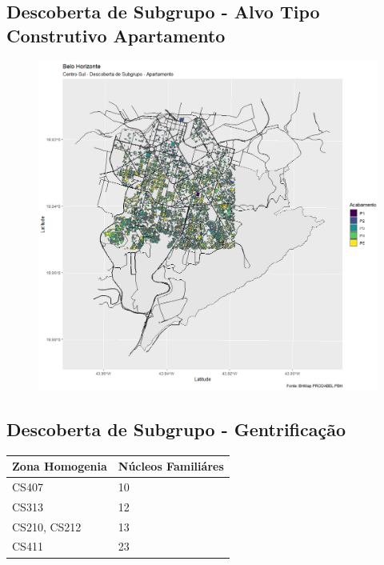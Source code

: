 \subsection{Descoberta de Subgrupo - Alvo Tipo Construtivo Apartamento}
\begin{frame}

    \begin{figure}[!htbp]
                \centering
       	    \includegraphics[scale=0.26]{imagens/cortana-ap.png}
            \end{figure}
\end{frame}

\subsection{Descoberta de Subgrupo - Gentrificação}
\begin{frame}

	\begin{table}[]
		\begin{tabular}{|l|l|}
			\hline
			\textbf{Zona Homogenia} & \textbf{Núcleos Familiáres}\\
			\hline
			\hline
			CS407 & 10 \\
			\hline
			CS313 & 12 \\
			\hline
			CS210, CS212 & 13 \\
			\hline
			CS411 & 23 \\
			\hline
		\end{tabular}
	\end{table}
\end{frame}
